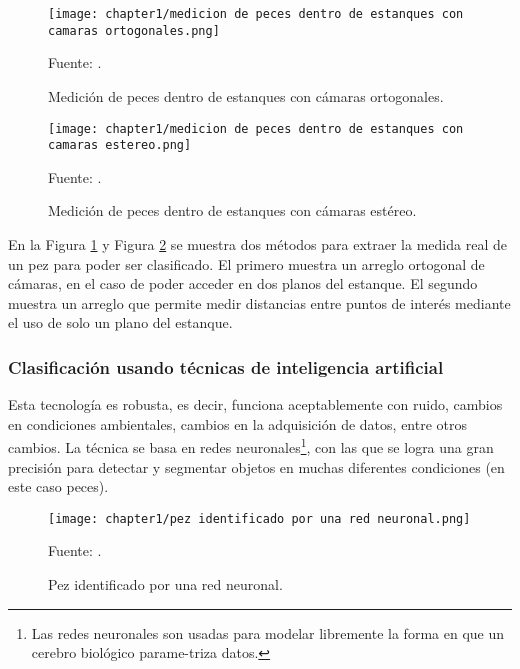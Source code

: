 \begin{figure}[H]
	\centering
	\texttt{[image: chapter1/medicion de peces dentro de estanques con camaras ortogonales.png]}
	\caption{Medición de  peces dentro de estanques con cámaras ortogonales.}
	Fuente: \cite{Al-Jubouri2017}.
	\label{fig:medicion de peces dentro de estanques con camaras ortogonales}
\end{figure}

\begin{figure}[H]
	\centering
	\texttt{[image: chapter1/medicion de peces dentro de estanques con camaras estereo.png]}
	\caption{Medición de  peces dentro de estanques con cámaras estéreo.}
	Fuente: \cite{Al-Jubouri2017}.
	\label{fig:medicion de peces dentro de estanques con camaras estereo}
\end{figure}

En la Figura \ref{fig:medicion de peces dentro de estanques con camaras ortogonales} y Figura \ref{fig:medicion de peces dentro de estanques con camaras estereo} se muestra dos métodos para extraer la medida real de un pez para poder ser clasificado. El primero muestra un arreglo ortogonal de cámaras, en el caso de poder acceder en dos planos del estanque. El segundo muestra un arreglo que permite medir distancias entre puntos de interés mediante el uso de solo un plano del estanque.

\subsubsection{Clasificación usando técnicas de inteligencia artificial}

Esta tecnología es robusta, es decir, funciona aceptablemente con ruido, cambios en condiciones ambientales, cambios en la adquisición de datos, entre otros cambios. La técnica se basa en redes neuronales\footnote{Las redes neuronales son usadas para modelar libremente la forma en que un cerebro biológico parame-triza datos.}, con las que se logra una gran precisión para detectar y segmentar objetos en muchas diferentes condiciones (en este caso peces).\\

\begin{figure}[H]
	\centering
	\texttt{[image: chapter1/pez identificado por una red neuronal.png]}
	\caption{Pez identificado por una red neuronal.}
	Fuente: \cite{Varalakshmi2019}.
	\label{fig:pez identificado por una red neuronal}
\end{figure}

